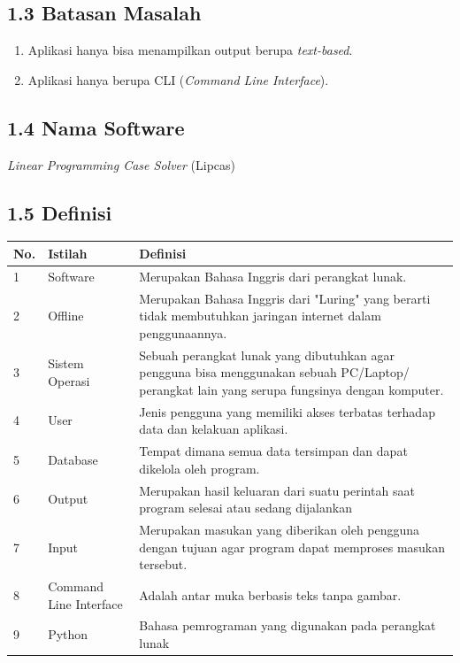 \documentclass[a4paper]{article}
\begin{document}
    \subsection*{1.3 Batasan Masalah}
    \begin{enumerate}
        \item Aplikasi hanya bisa menampilkan output berupa \textit{text-based}.
        \item Aplikasi hanya berupa CLI (\textit{Command Line Interface}).
    \end{enumerate}
    \subsection*{1.4 Nama Software}
    \noindent \textit{Linear Programming Case Solver} (Lipcas)
    \subsection*{1.5 Definisi }
    \begin{tabular}{ | m{1em}| m{} | m{} | }
        \hline
        \textbf{No.} & \textbf{Istilah} & \textbf{Definisi}\\
        \hline
        1 & Software & Merupakan Bahasa Inggris dari perangkat lunak.\\
        \hline
        2 & Offline & Merupakan Bahasa Inggris dari "Luring" yang berarti tidak
        membutuhkan jaringan internet dalam penggunaannya.\\
        \hline
        3 & Sistem Operasi & Sebuah perangkat lunak yang dibutuhkan
        agar pengguna bisa menggunakan sebuah PC/Laptop/ perangkat lain
        yang serupa fungsinya dengan komputer.\\
        \hline
        4 & User & Jenis pengguna yang memiliki akses terbatas terhadap
        data dan kelakuan aplikasi.\\
        \hline
        5 & Database & Tempat dimana semua data tersimpan dan dapat dikelola
        oleh program.\\
        \hline
        6 & Output & Merupakan hasil keluaran dari suatu perintah saat program
        selesai atau sedang dijalankan\\
        \hline
        7 & Input & Merupakan masukan yang diberikan oleh pengguna dengan tujuan 
        agar program dapat memproses masukan tersebut.\\
        \hline
        8 & Command Line Interface & Adalah antar muka berbasis teks tanpa gambar.\\
        \hline
        9 & Python & Bahasa pemrograman yang digunakan pada perangkat lunak \\
        \hline
    \end{tabular}
\end{document}
